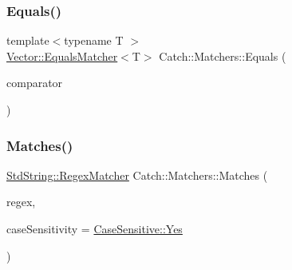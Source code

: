 \mbox{\label{namespace_catch_1_1_matchers_a332a401fb0da33c988e9cfa400ecce1b}} 
\subsubsection{\texorpdfstring{Equals()}{Equals()}\hspace{0.1cm}{\footnotesize\ttfamily [2/2]}}
{\footnotesize\ttfamily template$<$typename T $>$ \\
\mbox{\hyperlink{struct_catch_1_1_matchers_1_1_vector_1_1_equals_matcher}{Vector\+::\+Equals\+Matcher}}$<$T$>$ Catch\+::\+Matchers\+::\+Equals (\begin{DoxyParamCaption}\item[{std\+::vector$<$ T $>$ const \&}]{comparator }\end{DoxyParamCaption})}

\mbox{\label{namespace_catch_1_1_matchers_a82f1893cf50ae4c14b9b3e0980bf22b8}} 
\subsubsection{\texorpdfstring{Matches()}{Matches()}}
{\footnotesize\ttfamily \mbox{\hyperlink{struct_catch_1_1_matchers_1_1_std_string_1_1_regex_matcher}{Std\+String\+::\+Regex\+Matcher}} Catch\+::\+Matchers\+::\+Matches (\begin{DoxyParamCaption}\item[{std\+::string const \&}]{regex,  }\item[{\mbox{\hyperlink{struct_catch_1_1_case_sensitive_aad49d3aee2d97066642fffa919685c6a}{Case\+Sensitive\+::\+Choice}}}]{case\+Sensitivity = {\ttfamily \mbox{\hyperlink{struct_catch_1_1_case_sensitive_aad49d3aee2d97066642fffa919685c6aa7c5550b69ec3c502e6f609b67f9613c6}{Case\+Sensitive\+::\+Yes}}} }\end{DoxyParamCaption})}

\mbox{\label{namespace_catch_1_1_matchers_a034f2de6c0aac6f4a662fdf2558aedce}} 
